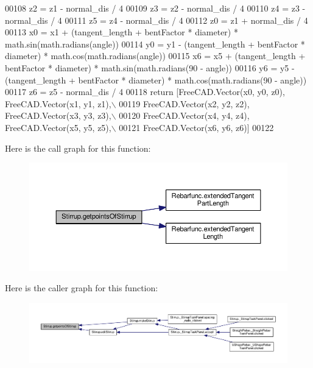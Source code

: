 \begin{DoxyCode}
00108         z2 = z1 - normal\_dis / 4
00109         z3 = z2 - normal\_dis / 4
00110         z4 = z3 - normal\_dis / 4
00111         z5 = z4 - normal\_dis / 4
00112         z0 = z1 + normal\_dis / 4
00113         x0 = x1 + (tangent\_length + bentFactor * diameter) * math.sin(math.radians(angle))
00114         y0 = y1 - (tangent\_length + bentFactor * diameter) * math.cos(math.radians(angle))
00115         x6 = x5 + (tangent\_length + bentFactor * diameter) * math.sin(math.radians(90 - angle))
00116         y6 = y5 - (tangent\_length + bentFactor * diameter) * math.cos(math.radians(90 - angle))
00117         z6 = z5 - normal\_dis / 4
00118     \textcolor{keywordflow}{return} [FreeCAD.Vector(x0, y0, z0), FreeCAD.Vector(x1, y1, z1),\(\backslash\)
00119             FreeCAD.Vector(x2, y2, z2), FreeCAD.Vector(x3, y3, z3),\(\backslash\)
00120             FreeCAD.Vector(x4, y4, z4), FreeCAD.Vector(x5, y5, z5),\(\backslash\)
00121             FreeCAD.Vector(x6, y6, z6)]
00122 
\end{DoxyCode}


Here is the call graph for this function\+:\nopagebreak
\begin{figure}[H]
\begin{center}
\leavevmode
\includegraphics[width=350pt]{namespaceStirrup_aa6df5118806bfe9d3a799e1bf549bb0a_cgraph}
\end{center}
\end{figure}




Here is the caller graph for this function\+:\nopagebreak
\begin{figure}[H]
\begin{center}
\leavevmode
\includegraphics[width=350pt]{namespaceStirrup_aa6df5118806bfe9d3a799e1bf549bb0a_icgraph}
\end{center}
\end{figure}


